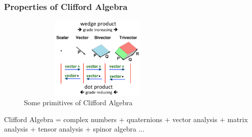   
  
  
  
  
  
  
 \begin{frame}\frametitle{Properties of Clifford Algebra} 


 \begin{figure}[t]

	\includegraphics[height=4cm, width=0.7\textwidth]{examples/figures/2.png}
 	\centering
 	 	\caption{Some primitives of Clifford Algebra }
 \end{figure}
 
 
   Clifford Algebra = complex numbers + quaternions + vector analysis + matrix analysis + tensor analysis + spinor algebra ...
   	
\end{frame}


